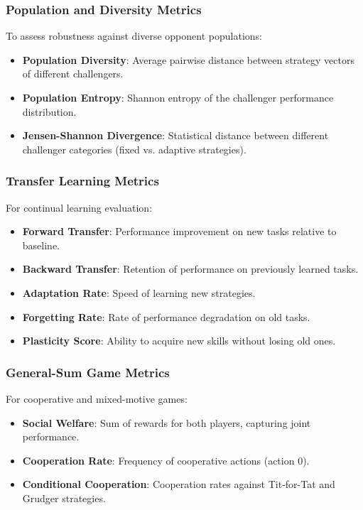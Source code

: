 \documentclass[sigconf,anonymous]{aamas}
\begin{document}
\subsubsection{Population and Diversity Metrics}
To assess robustness against diverse opponent populations:
\begin{itemize}
\item \textbf{Population Diversity}: Average pairwise distance between strategy vectors of different challengers.
\item \textbf{Population Entropy}: Shannon entropy of the challenger performance distribution.
\item \textbf{Jensen-Shannon Divergence}: Statistical distance between different challenger categories (fixed vs. adaptive strategies).
\end{itemize}

\subsubsection{Transfer Learning Metrics}
For continual learning evaluation:
\begin{itemize}
\item \textbf{Forward Transfer}: Performance improvement on new tasks relative to baseline.
\item \textbf{Backward Transfer}: Retention of performance on previously learned tasks.
\item \textbf{Adaptation Rate}: Speed of learning new strategies.
\item \textbf{Forgetting Rate}: Rate of performance degradation on old tasks.
\item \textbf{Plasticity Score}: Ability to acquire new skills without losing old ones.
\end{itemize}

\subsubsection{General-Sum Game Metrics}
For cooperative and mixed-motive games:
\begin{itemize}
\item \textbf{Social Welfare}: Sum of rewards for both players, capturing joint performance.
\item \textbf{Cooperation Rate}: Frequency of cooperative actions (action 0).
\item \textbf{Conditional Cooperation}: Cooperation rates against Tit-for-Tat and Grudger strategies.
\end{itemize}
\end{document}
